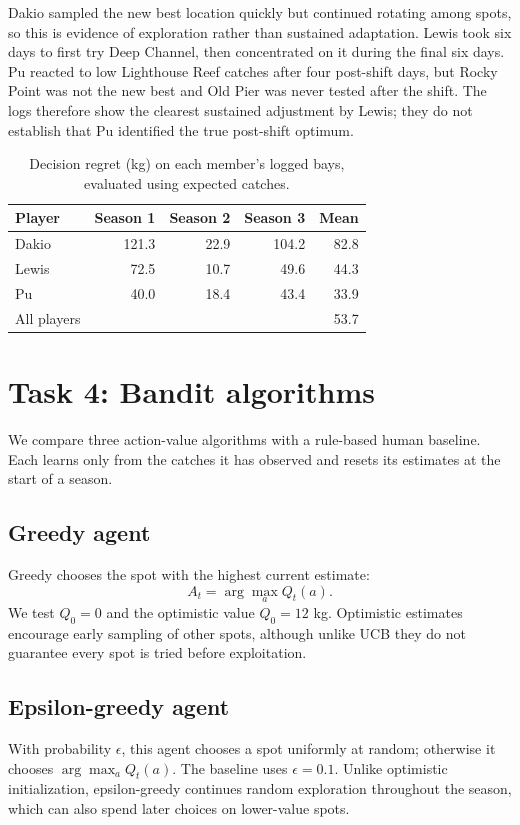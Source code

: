 \documentclass[11pt,a4paper]{article}
\begin{document}
Dakio sampled the new best location quickly but continued rotating among spots, so this is evidence of exploration rather than sustained adaptation. Lewis took six days to first try Deep Channel, then concentrated on it during the final six days. Pu reacted to low Lighthouse Reef catches after four post-shift days, but Rocky Point was not the new best and Old Pier was never tested after the shift. The logs therefore show the clearest sustained adjustment by Lewis; they do not establish that Pu identified the true post-shift optimum.

\begin{table}[H]\centering\small
\begin{tabular}{lrrrr}\toprule
Player & Season 1 & Season 2 & Season 3 & Mean\\\midrule
Dakio & 121.3 & 22.9 & 104.2 & 82.8\\
Lewis & 72.5 & 10.7 & 49.6 & 44.3\\
Pu & 40.0 & 18.4 & 43.4 & 33.9\\\midrule
All players & & & & 53.7\\\bottomrule
\end{tabular}
\caption{Decision regret (kg) on each member's logged bays, evaluated using expected catches.}
\end{table}

\section{Task 4: Bandit algorithms}
We compare three action-value algorithms with a rule-based human baseline. Each learns only from the catches it has observed and resets its estimates at the start of a season.

\subsection{Greedy agent}
Greedy chooses the spot with the highest current estimate:
\[
A_t=\arg\max_a Q_t(a).
\]
We test $Q_0=0$ and the optimistic value $Q_0=12$ kg. Optimistic estimates encourage early sampling of other spots, although unlike UCB they do not guarantee every spot is tried before exploitation.

\subsection{Epsilon-greedy agent}
With probability $\epsilon$, this agent chooses a spot uniformly at random; otherwise it chooses $\arg\max_a Q_t(a)$. The baseline uses $\epsilon=0.1$. Unlike optimistic initialization, epsilon-greedy continues random exploration throughout the season, which can also spend later choices on lower-value spots.
\end{document}
